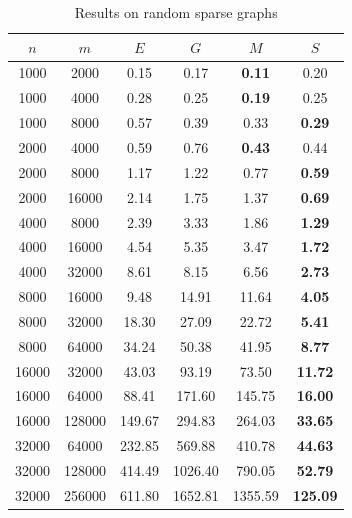 \begin{table}
\centering
\begin{tabular}{
cc|cccc}
$n$ & $m$ & $E$ & $G$ & $M$ & $S$ \\
\hline
1000 & 2000 & 0.15 & 0.17 & \textbf{0.11} & 0.20 \\
1000 & 4000 & 0.28 & 0.25 & \textbf{0.19} & 0.25 \\
1000 & 8000 & 0.57 & 0.39 & 0.33 & \textbf{0.29} \\
2000 & 4000 & 0.59 & 0.76 & \textbf{0.43} & 0.44 \\
2000 & 8000 & 1.17 & 1.22 & 0.77 & \textbf{0.59} \\
2000 & 16000 & 2.14 & 1.75 & 1.37 & \textbf{0.69} \\
4000 & 8000 & 2.39 & 3.33 & 1.86 & \textbf{1.29} \\
4000 & 16000 & 4.54 & 5.35 & 3.47 & \textbf{1.72} \\
4000 & 32000 & 8.61 & 8.15 & 6.56 & \textbf{2.73} \\
8000 & 16000 & 9.48 & 14.91 & 11.64 & \textbf{4.05} \\
8000 & 32000 & 18.30 & 27.09 & 22.72 & \textbf{5.41} \\
8000 & 64000 & 34.24 & 50.38 & 41.95 & \textbf{8.77} \\
16000 & 32000 & 43.03 & 93.19 & 73.50 & \textbf{11.72} \\
16000 & 64000 & 88.41 & 171.60 & 145.75 & \textbf{16.00} \\
16000 & 128000 & 149.67 & 294.83 & 264.03 & \textbf{33.65} \\
32000 & 64000 & 232.85 & 569.88 & 410.78 & \textbf{44.63} \\
32000 & 128000 & 414.49 & 1026.40 & 790.05 & \textbf{52.79} \\
32000 & 256000 & 611.80 & 1652.81 & 1355.59 & \textbf{125.09} \\
\end{tabular}
\caption{Results on random sparse graphs}\label{tab:sparse}
\end{table}

